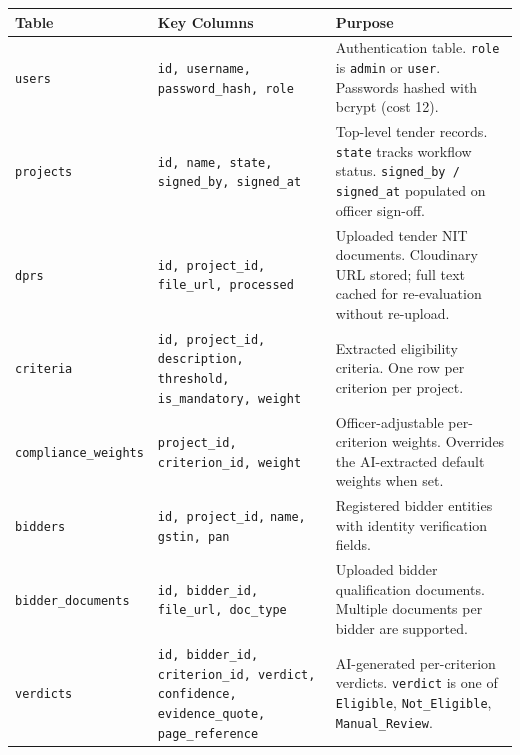 \documentclass[12pt,a4paper]{article}
\begin{document}
\begin{longtable}{@{}p{3.2cm}p{2.8cm}p{6.5cm}@{}}
\toprule
\textbf{Table} & \textbf{Key Columns} & \textbf{Purpose} \\
\midrule
\endhead
\texttt{users} &
    \texttt{id, username,} \newline \texttt{password\_hash, role} &
    Authentication table. \texttt{role} is \texttt{admin} or \texttt{user}.
    Passwords hashed with bcrypt (cost 12). \\[6pt]

\texttt{projects} &
    \texttt{id, name, state,} \newline \texttt{signed\_by, signed\_at} &
    Top-level tender records. \texttt{state} tracks workflow status.
    \texttt{signed\_by / signed\_at} populated on officer sign-off. \\[6pt]

\texttt{dprs} &
    \texttt{id, project\_id,} \newline \texttt{file\_url, processed} &
    Uploaded tender NIT documents. Cloudinary URL stored; full text
    cached for re-evaluation without re-upload. \\[6pt]

\texttt{criteria} &
    \texttt{id, project\_id,} \newline \texttt{description, threshold,} \newline
    \texttt{is\_mandatory, weight} &
    Extracted eligibility criteria. One row per criterion per project. \\[6pt]

\texttt{compliance\_weights} &
    \texttt{project\_id,} \newline \texttt{criterion\_id, weight} &
    Officer-adjustable per-criterion weights. Overrides the AI-extracted
    default weights when set. \\[6pt]

\texttt{bidders} &
    \texttt{id, project\_id,} \newline \texttt{name, gstin, pan} &
    Registered bidder entities with identity verification fields. \\[6pt]

\texttt{bidder\_documents} &
    \texttt{id, bidder\_id,} \newline \texttt{file\_url, doc\_type} &
    Uploaded bidder qualification documents. Multiple documents
    per bidder are supported. \\[6pt]

\texttt{verdicts} &
    \texttt{id, bidder\_id,} \newline \texttt{criterion\_id, verdict,} \newline
    \texttt{confidence, evidence\_quote,} \newline \texttt{page\_reference} &
    AI-generated per-criterion verdicts. \texttt{verdict} is one of
    \texttt{Eligible}, \texttt{Not\_Eligible}, \texttt{Manual\_Review}. \\[6pt]


\end{longtable}
\end{document}
